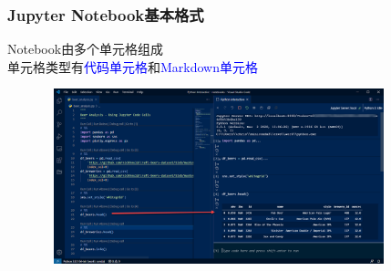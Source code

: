 \begin{frame}
	\frametitle{\textrm{Jupyter Notebook}基本格式}
		\textrm{Notebook}由多个单元格组成\\
		单元格类型有\textcolor{blue}{代码单元格}和\textcolor{blue}{\textrm{Markdown}单元格}
\begin{figure}[h!]
\centering
\includegraphics[height=2.0in, width=4.0in, viewport=0 0 1100 550,clip]{Figures/VS_code-vs-Jupyter_note.png}
\label{VS_code-vs-Jupyter_notebook}
\end{figure}
\end{frame}

